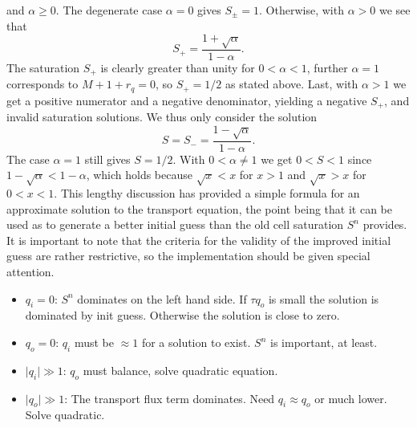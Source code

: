 and $\alpha \geq 0$. The degenerate case $\alpha = 0$ gives $S_{\pm} = 1$. Otherwise, with $\alpha > 0$ we see that
\begin{equation*}
S_{+} = \frac{1 + \sqrt{\alpha}}{1 - \alpha}.
\end{equation*}
The saturation $S_+$ is clearly greater than unity for $0  < \alpha < 1$, further $\alpha = 1$ corresponds to $M + 1 + r_q = 0$, so $S_+ = 1/2$ as stated above. Last, with $\alpha > 1$ we get a positive numerator and a negative denominator, yielding a negative $S_+$, and invalid saturation solutions. We thus only consider the solution
\begin{equation*}
S = S_{-} = \frac{1 - \sqrt{\alpha}}{1 - \alpha}.
\end{equation*}
The case $\alpha = 1$ still gives $S = 1/2$. With $0 < \alpha \neq 1$ we get $0 < S < 1$ since $1 - \sqrt{\alpha} < 1 - \alpha$, which holds because $\sqrt{x} < x$ for $x > 1$ and $\sqrt{x} > x$ for $0 < x < 1$. This lengthy discussion has provided a simple formula for an approximate solution to the transport equation, the point being that it can be used as to generate a better initial guess than the old cell saturation $S^n$ provides. It is important to note that the criteria for the validity of the improved initial guess are rather restrictive, so the implementation should be given special attention.

\noindent\makebox[\linewidth]{\rule{\textwidth}{0.4pt}}

\begin{itemize}
\item $q_i = 0$: $S^n$ dominates on the left hand side. If $\tau q_o$ is small the solution is dominated by init guess. Otherwise the solution is close to zero.
\item $q_o = 0$: $q_i$ must be $\approx 1$ for a solution to exist. $S^n$ is important, at least.
\item $\vert q_i \vert \gg 1$: $q_o$ must balance, solve quadratic equation.
\item $\vert q_o \vert \gg 1$: The transport flux term dominates. Need $q_i \approx q_o$ or much lower. Solve quadratic.

\end{itemize}

